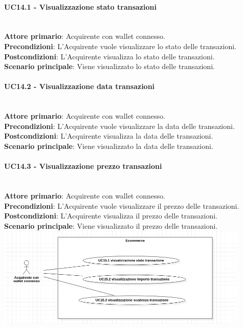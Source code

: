\documentclass[a4paper, 12pt]{article}
\begin{document}
\paragraph{UC14.1 - Visualizzazione stato transazioni}\\
\textbf{Attore primario}: Acquirente con wallet connesso.\\
\textbf{Precondizioni}: L'Acquirente vuole visualizzare lo stato delle transazioni.\\
\textbf{Postcondizioni}: L'Acquirente visualizza lo stato delle transazioni.\\
\textbf{Scenario principale}: Viene visualizzato lo stato delle transazioni.\\

\paragraph{UC14.2 - Visualizzazione data transazioni}\\
\textbf{Attore primario}: Acquirente con wallet connesso.\\
\textbf{Precondizioni}: L'Acquirente vuole visualizzare la data delle transazioni.\\
\textbf{Postcondizioni}: L'Acquirente visualizza la data delle transazioni.\\
\textbf{Scenario principale}: Viene visualizzato la data delle transazioni.\\

\paragraph{UC14.3 - Visualizzazione prezzo transazioni}\\
\textbf{Attore primario}: Acquirente con wallet connesso.\\
\textbf{Precondizioni}: L'Acquirente vuole visualizzare il prezzo delle transazioni.\\
\textbf{Postcondizioni}: L'Acquirente visualizza il prezzo delle transazioni.\\
\textbf{Scenario principale}: Viene visualizzato il prezzo delle transazioni.\\


\includegraphics[width=0.9\textwidth]{UC_ECA3}
\end{document}
